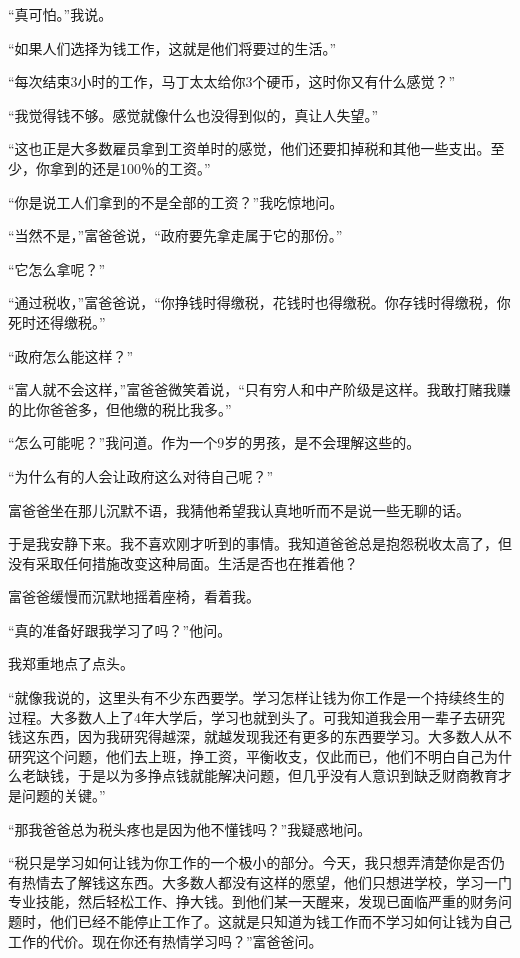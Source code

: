 “真可怕。”我说。

“如果人们选择为钱工作，这就是他们将要过的生活。”

“每次结束3小时的工作，马丁太太给你3个硬币，这时你又有什么感觉？”

“我觉得钱不够。感觉就像什么也没得到似的，真让人失望。”

“这也正是大多数雇员拿到工资单时的感觉，他们还要扣掉税和其他一些支出。至少，你拿到的还是100％的工资。”

“你是说工人们拿到的不是全部的工资？”我吃惊地问。

“当然不是，”富爸爸说，“政府要先拿走属于它的那份。”

“它怎么拿呢？”

“通过税收，”富爸爸说，“你挣钱时得缴税，花钱时也得缴税。你存钱时得缴税，你死时还得缴税。”

“政府怎么能这样？”

“富人就不会这样，”富爸爸微笑着说，“只有穷人和中产阶级是这样。我敢打赌我赚的比你爸爸多，但他缴的税比我多。”

“怎么可能呢？”我问道。作为一个9岁的男孩，是不会理解这些的。

“为什么有的人会让政府这么对待自己呢？”

富爸爸坐在那儿沉默不语，我猜他希望我认真地听而不是说一些无聊的话。

于是我安静下来。我不喜欢刚才听到的事情。我知道爸爸总是抱怨税收太高了，但没有采取任何措施改变这种局面。生活是否也在推着他？

富爸爸缓慢而沉默地摇着座椅，看着我。

“真的准备好跟我学习了吗？”他问。

我郑重地点了点头。

“就像我说的，这里头有不少东西要学。学习怎样让钱为你工作是一个持续终生的过程。大多数人上了4年大学后，学习也就到头了。可我知道我会用一辈子去研究钱这东西，因为我研究得越深，就越发现我还有更多的东西要学习。大多数人从不研究这个问题，他们去上班，挣工资，平衡收支，仅此而已，他们不明白自己为什么老缺钱，于是以为多挣点钱就能解决问题，但几乎没有人意识到缺乏财商教育才是问题的关键。”

“那我爸爸总为税头疼也是因为他不懂钱吗？”我疑惑地问。

“税只是学习如何让钱为你工作的一个极小的部分。今天，我只想弄清楚你是否仍有热情去了解钱这东西。大多数人都没有这样的愿望，他们只想进学校，学习一门专业技能，然后轻松工作、挣大钱。到他们某一天醒来，发现已面临严重的财务问题时，他们已经不能停止工作了。这就是只知道为钱工作而不学习如何让钱为自己工作的代价。现在你还有热情学习吗？”富爸爸问。

